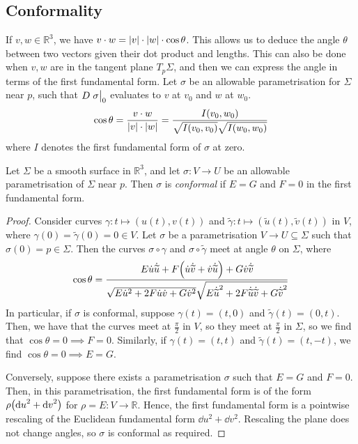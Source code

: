 \subsection{Conformality}
If \( v,w \in \mathbb R^3 \), we have \( v \cdot w = \abs{v} \cdot \abs{w} \cdot \cos\theta \).
This allows us to deduce the angle \( \theta \) between two vectors given their dot product and lengths.
This can also be done when \( v,w \) are in the tangent plane \( T_p \Sigma \), and then we can express the angle in terms of the first fundamental form.
Let \( \sigma \) be an allowable parametrisation for \( \Sigma \) near \( p \), such that \( D\eval{\sigma}_0 \) evaluates to \( v \) at \( v_0 \) and \( w \) at \( w_0 \).
\[ \cos \theta = \frac{v \cdot w}{\abs{v} \cdot \abs{w}} = \frac{I(v_0, w_0)}{\sqrt{I(v_0,v_0)} \sqrt{I(w_0,w_0)}} \]
where \( I \) denotes the first fundamental form of \( \sigma \) at zero.
\begin{lemma}
	Let \( \Sigma \) be a smooth surface in \( \mathbb R^3 \), and let \( \sigma \colon V \to U \) be an allowable parametrisation of \( \Sigma \) near \( p \).
	Then \( \sigma \) is \textit{conformal} if \( E = G \) and \( F = 0 \) in the first fundamental form.
\end{lemma}
\begin{proof}
	Consider curves \( \gamma \colon t \mapsto (u(t), v(t)) \) and \( \widetilde \gamma \colon t \mapsto (\widetilde u(t), \widetilde v(t)) \) in \( V \), where \( \gamma(0) = \widetilde \gamma(0) = 0 \in V \).
	Let \( \sigma \) be a parametrisation \( V \to U \subseteq \Sigma \) such that \( \sigma(0) = p \in \Sigma \).
	Then the curves \( \sigma \circ \gamma \) and \( \sigma \circ \widetilde \gamma \) meet at angle \( \theta \) on \( \Sigma \), where
	\[ \cos \theta = \frac{E \dot u \dot {\widetilde u} + F \qty(\dot u \dot{\widetilde v} + \dot v \dot{\widetilde u}) + G \dot v \dot{\widetilde v}}{\sqrt{E \dot u^2 + 2F \dot u \dot v + G \dot v^2} \sqrt{E \dot{\widetilde u}^2 + 2F \dot{\widetilde u} \dot {\widetilde v} + G \dot{\widetilde v}^2}} \]
	In particular, if \( \sigma \) is conformal, suppose \( \gamma(t) = (t,0) \) and \( \widetilde \gamma(t) = (0,t) \).
	Then, we have that the curves meet at \( \frac{\pi}{2} \) in \( V \), so they meet at \( \frac{\pi}{2} \) in \( \Sigma \), so we find that \( \cos \theta = 0 \implies F = 0 \).
	Similarly, if \( \gamma(t) = (t,t) \) and \( \widetilde \gamma(t) = (t,-t) \), we find \( \cos \theta = 0 \implies E = G \).

	Conversely, suppose there exists a parametrisation \( \sigma \) such that \( E = G \) and \( F = 0 \).
	Then, in this parametrisation, the first fundamental form is of the form \( \rho \qty(\dd{u}^2 + \dd{v}^2) \) for \( \rho = E \colon V \to \mathbb R \).
	Hence, the first fundamental form is a pointwise rescaling of the Euclidean fundamental form \( \dd{u}^2 + \dd{v}^2 \).
	Rescaling the plane does not change angles, so \( \sigma \) is conformal as required.
\end{proof}
